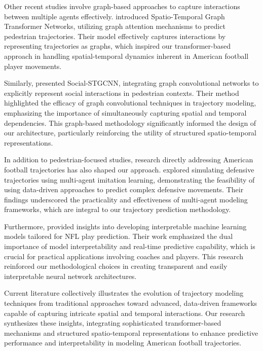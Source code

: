 \documentclass[sigconf]{acmart}
\begin{document}
Other recent studies involve graph-based approaches to capture interactions between multiple agents effectively. \cite{Yu2020} introduced Spatio-Temporal Graph Transformer Networks, utilizing graph attention mechanisms to predict pedestrian trajectories. Their model effectively captures interactions by representing trajectories as graphs, which inspired our transformer-based approach in handling spatial-temporal dynamics inherent in American football player movements.

Similarly, \cite{Mohamed2020} presented Social-STGCNN, integrating graph convolutional networks to explicitly represent social interactions in pedestrian contexts. Their method highlighted the efficacy of graph convolutional techniques in trajectory modeling, emphasizing the importance of simultaneously capturing spatial and temporal dependencies. This graph-based methodology significantly informed the design of our architecture, particularly reinforcing the utility of structured spatio-temporal representations.

In addition to pedestrian-focused studies, research directly addressing American football trajectories has also shaped our approach. \cite{Schmid2021} explored simulating defensive trajectories using multi-agent imitation learning, demonstrating the feasibility of using data-driven approaches to predict complex defensive movements. Their findings underscored the practicality and effectiveness of multi-agent modeling frameworks, which are integral to our trajectory prediction methodology.

Furthermore, \cite{Fernandes2020} provided insights into developing interpretable machine learning models tailored for NFL play prediction. Their work emphasized the dual importance of model interpretability and real-time predictive capability, which is crucial for practical applications involving coaches and players. This research reinforced our methodological choices in creating transparent and easily interpretable neural network architectures.

Current literature collectively illustrates the evolution of trajectory modeling techniques from traditional approaches toward advanced, data-driven frameworks capable of capturing intricate spatial and temporal interactions. Our research synthesizes these insights, integrating sophisticated transformer-based mechanisms and structured spatio-temporal representations to enhance predictive performance and interpretability in modeling American football trajectories.
\end{document}
